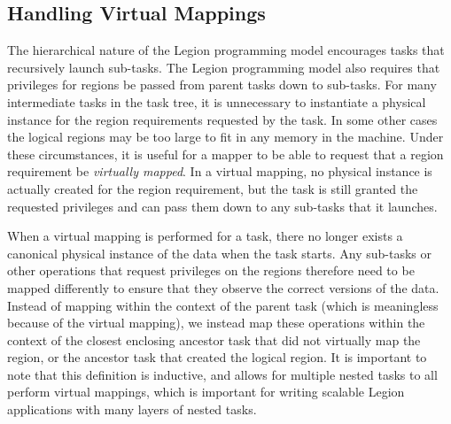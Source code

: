 \subsection{Handling Virtual Mappings}
\label{subsec:virtualmap}
The hierarchical nature of the Legion programming model
encourages tasks that recursively launch sub-tasks.
The Legion programming model also requires that privileges
for regions be passed from parent tasks down to sub-tasks.
For many intermediate tasks in the task tree, it is
unnecessary to instantiate a physical instance for
the region requirements requested by the task.  In some
other cases the logical regions may be too large to fit 
in any memory in the machine.  Under these circumstances,
it is useful for a mapper to be able to request that 
a region requirement be {\em virtually mapped}. In a
virtual mapping, no physical instance is actually created
for the region requirement, but the task is still granted
the requested privileges and can pass them down to any 
sub-tasks that it launches.

When a virtual mapping is performed for a task, there no
longer exists a canonical physical instance of the data
when the task starts.  Any sub-tasks or other operations
that request privileges on the regions therefore need to be
mapped differently to ensure that they observe the correct
versions of the data. Instead of mapping within the context
of the parent task (which is meaningless because of the
virtual mapping), we instead map these operations within
the context of the closest enclosing ancestor task that 
did not virtually map the region, or the ancestor task
that created the logical region. It is important to note
that this definition is inductive, and allows for multiple
nested tasks to all perform virtual mappings, which is
important for writing scalable Legion applications with
many layers of nested tasks.

